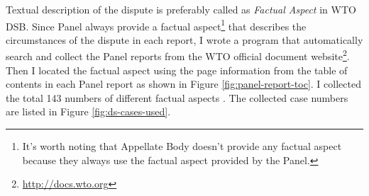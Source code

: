Textual description of the dispute is preferably called as
\textit{Factual Aspect} in WTO DSB.
Since Panel
always provide a factual aspect\footnote{
  It's worth noting that Appellate Body doesn't provide any factual aspect because they always use the factual aspect provided by the Panel.
}
that describes the circumstances of the dispute
in each report, %
I wrote a program that
automatically search and collect
the Panel reports from the WTO official document website\footnote{
  \url{http://docs.wto.org}
}.
Then I located the factual aspect using the page information from the
table of contents in each Panel report as shown in Figure \ref{fig:panel-report-toc}.
I collected the total 143 numbers of different factual aspects . The collected case numbers are listed in Figure \ref{fig:ds-cases-used}.

